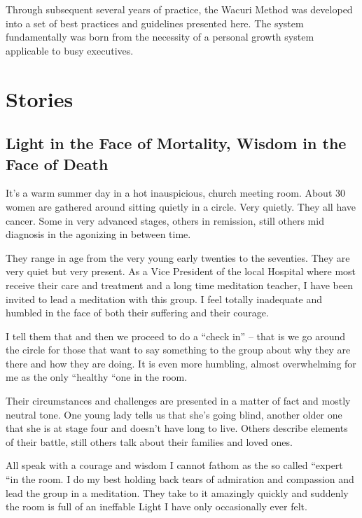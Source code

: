 \documentclass[12pt]{book}
\begin{document}
Through subsequent several years of practice, the Wacuri Method was developed into a set of best practices and guidelines presented here. The system fundamentally was born from the necessity of a personal growth system applicable to busy executives.
				
			
	

\chapter{Stories}

\section{Light in the Face of Mortality, Wisdom in the Face of Death}
					


It’s a warm summer day in a hot inauspicious, church meeting room. About 30 women are gathered around sitting quietly in a circle. Very quietly. They all have cancer. Some in very advanced stages, others in remission, still others mid diagnosis in the agonizing in between time. 

They range in age from the very young early twenties to the seventies. They are very quiet but very present. As a Vice President of the local Hospital where most receive their care and treatment and a long time meditation teacher, I have been invited to lead a meditation with this group. I feel totally inadequate and humbled in the face of both their suffering and their courage.

 I tell them that and then we proceed to do a “check in” – that is we go around the circle for those that want to say something to the group about why they are there and how they are doing. It is even more humbling, almost overwhelming for me as the only “healthy “one in the room.

Their circumstances and challenges are presented in a matter of fact and mostly neutral tone. One young lady tells us that she’s going blind, another older one that she is at stage four and doesn’t have long to live. Others describe elements of their battle, still others talk about their families and loved ones.

All speak with a courage and wisdom I cannot fathom as the so called “expert “in the room.  I do my best holding back tears of admiration and compassion and lead the group in a meditation. They take to it amazingly quickly and suddenly the room is full of an ineffable Light I have only occasionally ever felt.
\end{document}
